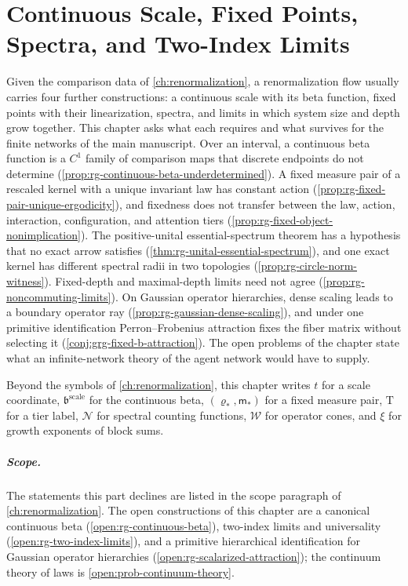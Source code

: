 \chapter{Continuous Scale, Fixed Points, Spectra, and Two-Index Limits}
\label{ch:wilsonian-limits}

Given the comparison data of \cref{ch:renormalization}, a renormalization
flow usually carries four further constructions: a continuous scale with its
beta function, fixed points with their linearization, spectra, and limits in
which system size and depth grow together. This chapter asks what each
requires and what survives for the finite networks of the main manuscript.
Over an interval, a continuous beta function is a \(C^1\) family of comparison
maps that discrete endpoints do not determine
(\cref{prop:rg-continuous-beta-underdetermined}). A fixed measure pair of a
rescaled kernel with a unique invariant law has constant action
(\cref{prop:rg-fixed-pair-unique-ergodicity}), and fixedness does not transfer
between the law, action, interaction, configuration, and attention tiers
(\cref{prop:rg-fixed-object-nonimplication}). The positive-unital
essential-spectrum theorem has a hypothesis that no exact arrow satisfies
(\cref{thm:rg-unital-essential-spectrum}), and one exact kernel has different
spectral radii in two topologies (\cref{prop:rg-circle-norm-witness}).
Fixed-depth and maximal-depth limits need not agree
(\cref{prop:rg-noncommuting-limits}). On Gaussian operator hierarchies, dense
scaling leads to a boundary operator ray
(\cref{prop:rg-gaussian-dense-scaling}), and under one primitive
identification Perron--Frobenius attraction fixes the fiber matrix without
selecting it (\cref{conj:grg-fixed-b-attraction}). The open problems of the
chapter state what an infinite-network theory of the agent network would have
to supply.

Beyond the symbols of \cref{ch:renormalization}, this chapter writes \(t\) for
a scale coordinate, \(\mathfrak b^{\mathrm{scale}}\) for the continuous beta,
\((\varrho_*,\mathsf m_*)\) for a fixed measure pair, \(\mathrm T\) for a tier label,
\(\mathcal N\) for spectral counting functions, \(\mathcal W\) for operator
cones, and \(\xi\) for growth exponents of block sums.

\paragraph{Scope.}
The statements this part declines are listed in the scope paragraph of
\cref{ch:renormalization}. The open constructions of this chapter are a
canonical continuous beta (\cref{open:rg-continuous-beta}), two-index limits
and universality (\cref{open:rg-two-index-limits}), and a primitive
hierarchical identification for Gaussian operator hierarchies
(\cref{open:rg-scalarized-attraction}); the continuum theory of laws is
\cref{open:prob-continuum-theory}.


